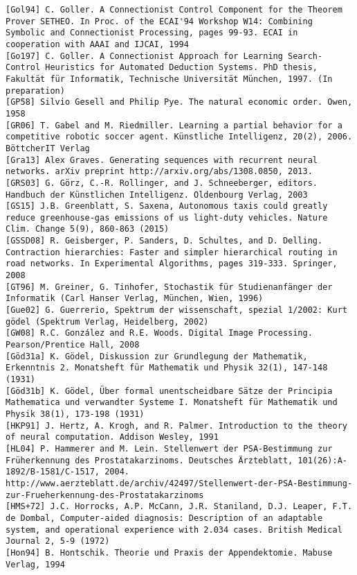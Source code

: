 \documentclass[10pt]{article}
\begin{document}
\begin{verbatim}
[Gol94] C. Goller. A Connectionist Control Component for the Theorem Prover SETHEO. In Proc. of the ECAI'94 Workshop W14: Combining Symbolic and Connectionist Processing, pages 99-93. ECAI in cooperation with AAAI and IJCAI, 1994
[Go197] C. Goller. A Connectionist Approach for Learning Search-Control Heuristics for Automated Deduction Systems. PhD thesis, Fakultät für Informatik, Technische Universität München, 1997. (In preparation)
[GP58] Silvio Gesell and Philip Pye. The natural economic order. Owen, 1958
[GR06] T. Gabel and M. Riedmiller. Learning a partial behavior for a competitive robotic soccer agent. Künstliche Intelligenz, 20(2), 2006. BöttcherIT Verlag
[Gra13] Alex Graves. Generating sequences with recurrent neural networks. arXiv preprint http://arxiv.org/abs/1308.0850, 2013.
[GRS03] G. Görz, C.-R. Rollinger, and J. Schneeberger, editors. Handbuch der Künstlichen Intelligenz. Oldenbourg Verlag, 2003
[GS15] J.B. Greenblatt, S. Saxena, Autonomous taxis could greatly reduce greenhouse-gas emissions of us light-duty vehicles. Nature Clim. Change 5(9), 860-863 (2015)
[GSSD08] R. Geisberger, P. Sanders, D. Schultes, and D. Delling. Contraction hierarchies: Faster and simpler hierarchical routing in road networks. In Experimental Algorithms, pages 319-333. Springer, 2008
[GT96] M. Greiner, G. Tinhofer, Stochastik für Studienanfänger der Informatik (Carl Hanser Verlag, München, Wien, 1996)
[Gue02] G. Guerrerio, Spektrum der wissenschaft, spezial 1/2002: Kurt gödel (Spektrum Verlag, Heidelberg, 2002)
[GW08] R.C. González and R.E. Woods. Digital Image Processing. Pearson/Prentice Hall, 2008
[Göd31a] K. Gödel, Diskussion zur Grundlegung der Mathematik, Erkenntnis 2. Monatsheft für Mathematik und Physik 32(1), 147-148 (1931)
[Göd31b] K. Gödel, Über formal unentscheidbare Sätze der Principia Mathematica und verwandter Systeme I. Monatsheft für Mathematik und Physik 38(1), 173-198 (1931)
[HKP91] J. Hertz, A. Krogh, and R. Palmer. Introduction to the theory of neural computation. Addison Wesley, 1991
[HL04] P. Hammerer and M. Lein. Stellenwert der PSA-Bestimmung zur Früherkennung des Prostatakarzinoms. Deutsches Ärzteblatt, 101(26):A-1892/B-1581/C-1517, 2004. http://www.aerzteblatt.de/archiv/42497/Stellenwert-der-PSA-Bestimmung-zur-Frueherkennung-des-Prostatakarzinoms
[HMS+72] J.C. Horrocks, A.P. McCann, J.R. Staniland, D.J. Leaper, F.T. de Dombal, Computer-aided diagnosis: Description of an adaptable system, and operational experience with 2.034 cases. British Medical Journal 2, 5-9 (1972)
[Hon94] B. Hontschik. Theorie und Praxis der Appendektomie. Mabuse Verlag, 1994

\end{verbatim}
\end{document}
